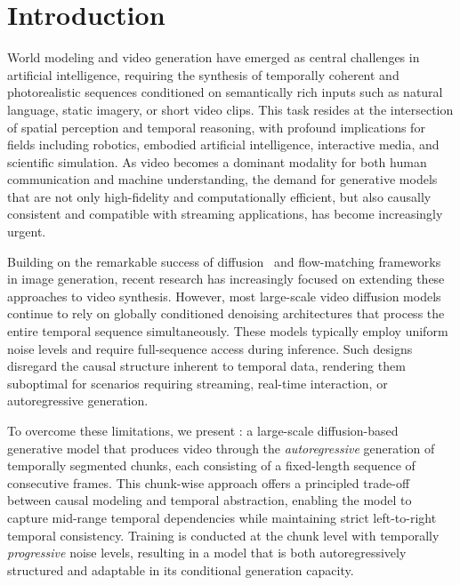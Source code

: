 \section{Introduction}

World modeling and video generation have emerged as central challenges in artificial intelligence, requiring the synthesis of temporally coherent and photorealistic sequences conditioned on semantically rich inputs such as natural language, static imagery, or short video clips. This task resides at the intersection of spatial perception and temporal reasoning, with profound implications for fields including robotics, embodied artificial intelligence, interactive media, and scientific simulation. As video becomes a dominant modality for both human communication and machine understanding, the demand for generative models that are not only high-fidelity and computationally efficient, but also causally consistent and compatible with streaming applications, has become increasingly urgent.

Building on the remarkable success of diffusion~\citep{sohl2015deep, ho2020denoising, song2020score} and flow-matching frameworks~\citep{lipman2022flow, liu2022flow} in image generation, recent research has increasingly focused on extending these approaches to video synthesis. However, most large-scale video diffusion models continue to rely on globally conditioned denoising architectures that process the entire temporal sequence simultaneously. These models typically employ uniform noise levels and require full-sequence access during inference. Such designs disregard the causal structure inherent to temporal data, rendering them suboptimal for scenarios requiring streaming, real-time interaction, or autoregressive generation.

To overcome these limitations, we present \magi: a large-scale diffusion-based generative model that produces video through the \textit{autoregressive} generation of temporally segmented chunks, each consisting of a fixed-length sequence of consecutive frames. This chunk-wise approach offers a principled trade-off between causal modeling and temporal abstraction, enabling the model to capture mid-range temporal dependencies while maintaining strict left-to-right temporal consistency. Training is conducted at the chunk level with temporally \textit{progressive} noise levels, resulting in a model that is both autoregressively structured and adaptable in its conditional generation capacity.

